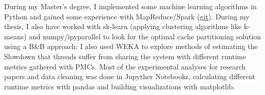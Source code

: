 \documentclass[11pt, a4paper]{awesome-cv}
\begin{document}
\begin{cvletter}
During my Master’s degree, I implemented some machine learning algorithms in Python and gained some experience with MapReduce/Spark ({\color{blue}\href{https://github.com/mizadri/big-data}{git}}). During my thesis, I also have worked with sk-learn (applying clustering algorithms like k-means) and numpy/ipyparallel to look for the optimal cache partitioning solution using a B\&B approach; I also used WEKA to explore methods of estimating the Slowdown that threads suffer from sharing the system with different runtime metrics gathered with PMCs. Most of the experimental analyses for research papers and data cleaning was done in Jupyther Notebooks, calculating different runtime metrics with pandas and building visualizations with matplotlib. 


\end{cvletter}


\makeletterclosing
\end{document}
